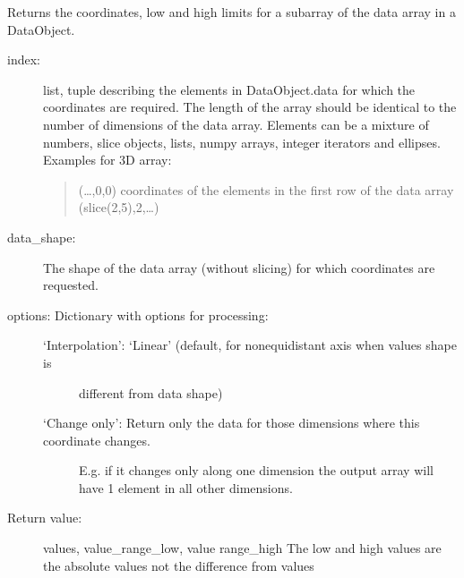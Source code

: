 \documentclass[letterpaper,10pt,english]{sphinxmanual}
\begin{document}
\begin{fulllineitems}
\begin{fulllineitems}
\end{fulllineitems}


\begin{fulllineitems}
\label{\detokenize{coordinate:flap.coordinate.Coordinate.data}}
Returns the coordinates, low and high limits for a sub\sphinxhyphen{}array of the data array in a DataObject.
\begin{description}
\item[{index:}] \leavevmode
list, tuple describing the elements in DataObject.data for which the coordinates are
required. The length of the array should be identical to the number of dimensions
of the data array. Elements can be a mixture of numbers, slice objects, lists, numpy arrays,
integer iterators and ellipses.
Examples for 3D array:
\begin{quote}

(…,0,0) coordinates of the elements in the first row of the data array
(slice(2,5),2,…)
\end{quote}

\item[{data\_shape:}] \leavevmode
The shape of the data array (without slicing) for which coordinates are requested.

\item[{options: Dictionary with options for processing:}] \leavevmode\begin{description}
\item[{‘Interpolation’: ‘Linear’ (default, for non\sphinxhyphen{}equidistant axis when values shape is}] \leavevmode
different from data shape)

\item[{‘Change only’: Return only the data for those dimensions where this coordinate changes.}] \leavevmode
E.g. if it changes only along one dimension the output array will have 1 element
in all other dimensions.

\end{description}

\item[{Return value:}] \leavevmode
values, value\_range\_low, value range\_high
The low and high values are the absolute values not the difference from values


\end{description}
\end{fulllineitems}
\end{fulllineitems}
\end{document}
